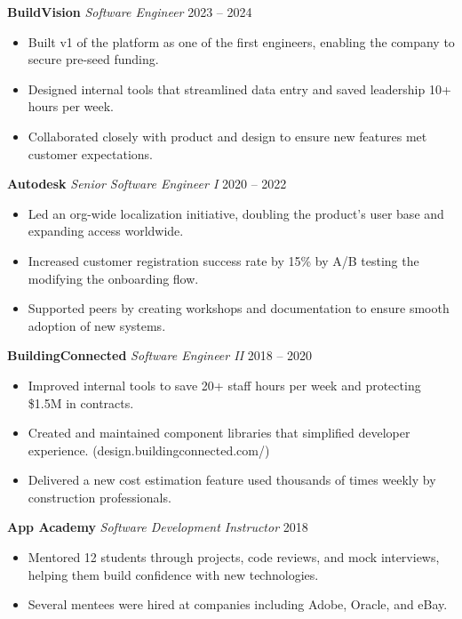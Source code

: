 \documentclass[a4paper]{article}
\renewcommand{\small}{\fontsize{9.5}{12}\selectfont\itshape}
\begin{document}
\textbf{BuildVision} \textcolor{tertiary}{{\small{Software Engineer}}} \hfill \textcolor{tertiary}{2023 – 2024}\\
\vspace{-2mm}
\begin{itemize} \itemsep .5pt
    \item Built v1 of the platform as one of the first engineers, enabling the company to secure pre-seed funding.
    \item Designed internal tools that streamlined data entry and saved leadership 10+ hours per week.
    \item Collaborated closely with product and design to ensure new features met customer expectations.
\end{itemize}

\textbf{Autodesk} \textcolor{tertiary}{{\small{Senior Software Engineer I}}} \hfill \textcolor{tertiary}{2020 – 2022}\\
\vspace{-2mm}
\begin{itemize} \itemsep .5pt
    \item Led an org-wide localization initiative, doubling the product’s user base and expanding access worldwide.
    \item Increased customer registration success rate by 15\% by A/B testing the modifying the onboarding flow.
    \item Supported peers by creating workshops and documentation to ensure smooth adoption of new systems.
\end{itemize}

\textbf{BuildingConnected} \textcolor{tertiary}{{\small{Software Engineer II}}} \hfill \textcolor{tertiary}{2018 – 2020}\\
\vspace{-2mm}
\begin{itemize} \itemsep .5pt
    \item Improved internal tools to save 20+ staff hours per week and protecting \$1.5M in contracts.
    \item Created and maintained component libraries that simplified developer experience. (design.buildingconnected.com/)
    \item Delivered a new cost estimation feature used thousands of times weekly by construction professionals.
\end{itemize}

\textbf{App Academy} \textcolor{tertiary}{{\small{Software Development Instructor}}} \hfill \textcolor{tertiary}{2018}\\
\vspace{-2mm}
\begin{itemize} \itemsep .5pt
    \item Mentored 12 students through projects, code reviews, and mock interviews, helping them build confidence with new technologies.
    \item Several mentees were hired at companies including Adobe, Oracle, and eBay.
\end{itemize}
\end{document}
